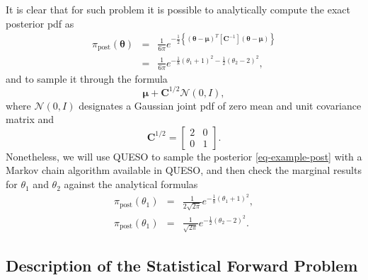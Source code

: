 It is clear that for such problem it is possible to analytically compute the exact posterior pdf as
\begin{eqnarray*}
\pi_{\text{post}}(\boldsymbol{\theta}) & = & \frac{1}{6\pi} e^{-\frac{1}{2}\left\{(\boldsymbol{\theta}-\boldsymbol{\mu})^T[\mathbf{C}^{-1}](\boldsymbol{\theta}-\boldsymbol{\mu})\right\}} \\
                                       & = & \frac{1}{6\pi} e^{-\frac{1}{8}(\theta_1+1)^2 - \frac{1}{2}(\theta_2-2)^2}, \label{eq-example-exact-joint}
\end{eqnarray*}
and to sample it through the formula
\begin{equation*}
\boldsymbol{\mu}+\mathbf{C}^{1/2}\mathcal{N}(0,I),
\end{equation*}
where $\mathcal{N}(0,I)$ designates a Gaussian joint pdf of zero mean and unit covariance matrix
and
\begin{equation*}
\mathbf{C}^{1/2} = 
\left[
\begin{array}{cc}
2 & 0 \\
0 & 1
\end{array}
\right].
\end{equation*}
Nonetheless, we will use QUESO to sample the posterior \eqref{eq-example-post}
with a Markov chain algorithm available in QUESO, and
then check the marginal results for $\theta_1$ and $\theta_2$ against the analytical formulas
\begin{eqnarray*}
\pi_{\text{post}}(\theta_1) & = & \frac{1}{2\sqrt{2\pi}} e^{-\frac{1}{8}(\theta_1+1)^2}, \label{eq-example-exact-marg-1}\\
\pi_{\text{post}}(\theta_1) & = & \frac{1}{ \sqrt{2\pi}} e^{-\frac{1}{2}(\theta_2-2)^2}. \label{eq-example-exact-marg-2}
\end{eqnarray*}

\subsection{Description of the Statistical Forward Problem}

